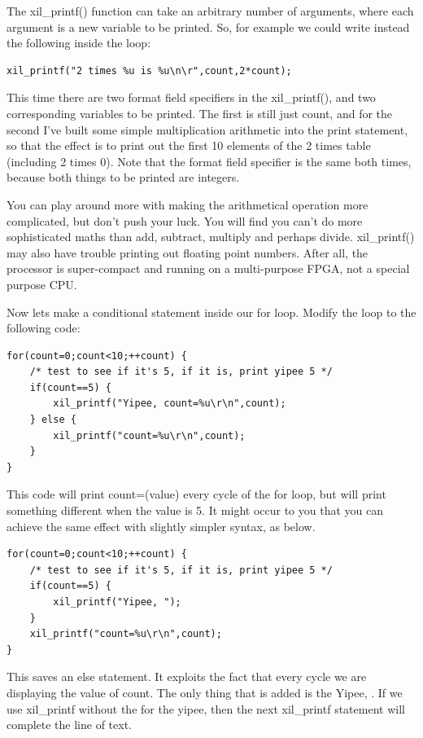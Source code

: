 \documentclass[../physical_computing.tex]{subfiles}
\begin{document}
The xil\_printf() function can take an arbitrary number of arguments,
where each argument is a new variable to be printed. So, for 
example we could write instead the following inside the loop:

\begin{verbatim}
xil_printf("2 times %u is %u\n\r",count,2*count);
\end{verbatim}

This time there are two format field specifiers in the xil\_printf(),
and two corresponding variables to be printed. The first is still
just count, and for the second I've built some simple multiplication 
arithmetic into the print statement, so that the effect is to print
out the first 10 elements of the 2 times table (including 2 times 0).
Note that the format field specifier is the same both times, because
both things to be printed are integers.

You can play around more with making the arithmetical operation 
more complicated, but don't push your luck. You will find you can't
do more sophisticated maths than add, subtract, multiply and perhaps
divide. xil\_printf() may also have trouble printing out floating
point numbers. After all, the processor is super-compact and running
on a multi-purpose FPGA, not a special purpose CPU.

Now lets make a conditional statement inside our for loop. Modify 
the loop to the following code:

\begin{verbatim}
for(count=0;count<10;++count) {
    /* test to see if it's 5, if it is, print yipee 5 */
    if(count==5) {
    	xil_printf("Yipee, count=%u\r\n",count);
    } else {
    	xil_printf("count=%u\r\n",count);
    }
}
\end{verbatim}

This code will print count=(value) every cycle of the for loop, 
but will print something different when the value is 5. It might
occur to you that you can achieve the same effect with slightly 
simpler syntax, as below.

\begin{verbatim}
for(count=0;count<10;++count) {
    /* test to see if it's 5, if it is, print yipee 5 */
    if(count==5) {
    	xil_printf("Yipee, ");
    }
    xil_printf("count=%u\r\n",count);
}
\end{verbatim}

This saves an else statement. It exploits the fact that every 
cycle we are displaying the value of count. The only thing that 
is added is the Yipee, . If we use xil\_printf without the 
\texttt{\crlf} for the yipee, then the next xil\_printf statement
will complete the line of text. 
\end{document}
